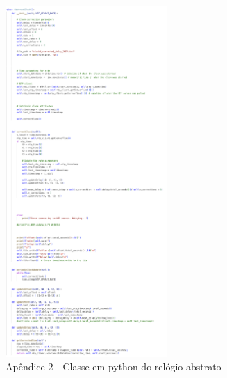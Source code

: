 \documentclass[conference]{IEEEtran}
\begin{document}
\begin{figure}[h]
    \centering
    \includegraphics[width=0.55\textwidth]{figures/relogioAbstrato.png}
    \caption*{Apêndice 2 - Classe em python do relógio abstrato}
\end{figure}
\end{document}
